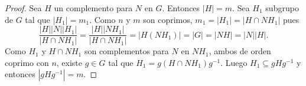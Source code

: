 \begin{proof}
	Sea $H$ un complemento para $N$ en $G$. Entonces $|H|=m$. Sea $H_1$
	subgrupo de $G$ tal que $|H_1|=m_1$. 
	Como $n$ y $m$ son coprimos, $m_1=|H_1|=|H\cap NH_1|$ pues
	\[
	\frac{|H||N||H_1|}{|H\cap NH_1|}=
	\frac{|H||NH_1|}{|H\cap NH_1|}=|H(NH_1)|=|G|=|NH|=|N||H|.
	\]
	Como $H_1$ y $H\cap NH_1$ son complementos para $N$ en $NH_1$, ambos de
	orden coprimo con $n$, existe $g\in G$ tal que $H_1=g(H\cap NH_1)g^{-1}$. Luego 
	$H_1\subseteq gHg^{-1}$ y entonces $|gHg^{-1}|=m$. 
\end{proof}


